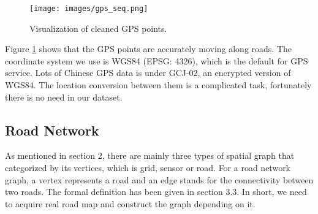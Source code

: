 \begin{figure}[htb]
  \centering
  \texttt{[image: images/gps\_seq.png]}
  \caption{Visualization of cleaned GPS points.}
  \label{fig: gps_seq}
\end{figure}

Figure \ref{fig: gps_seq} shows that the GPS points are accurately moving along roads. The coordinate system we use is WGS84 (EPSG: 4326), which is the default for GPS service. Lots of Chinese GPS data is under GCJ-02, an encrypted version of WGS84. The location conversion between them is a complicated task, fortunately there is no need in our dataset.

\subsection{Road Network}
As mentioned in section 2, there are mainly three types of spatial graph that categorized by its vertices, which is grid, sensor or road. For a road network graph, a vertex represents a road and an edge stands for the connectivity between two roads. The formal definition has been given in section 3.3. In short, we need to acquire real road map and construct the graph depending on it.

